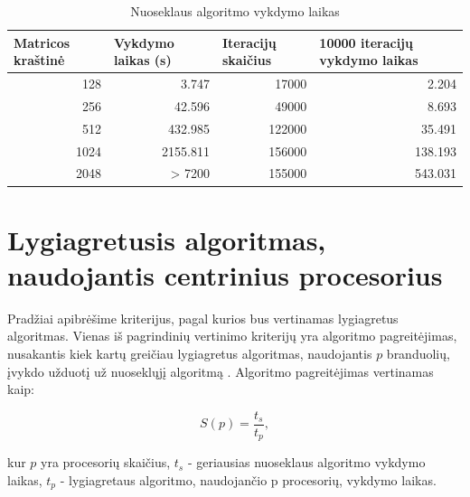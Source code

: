 \documentclass{VUMIFPSbakalaurinis}
\begin{document}
\begin{table}[]
    \begin{tabular}{|r|r|r|r|}
        \hline
        \multicolumn{1}{|l|}{Matricos kraštinė} & \multicolumn{1}{|l|}{Vykdymo laikas (s)} & \multicolumn{1}{|l|}{Iteracijų skaičius} & \multicolumn{1}{|l|}{10000 iteracijų vykdymo laikas} \\ \hline
        128                                     & 3.747                                    & 17000                                    & 2.204                                                \\ \hline
        256                                     & 42.596                                   & 49000                                    & 8.693                                                \\ \hline
        512                                     & 432.985                                  & 122000                                   & 35.491                                               \\ \hline
        1024                                    & 2155.811                                 & 156000                                   & 138.193                                              \\ \hline
        2048                                    & > 7200                                   & 155000                                   & 543.031                                              \\ \hline
    \end{tabular}
    \caption{Nuoseklaus algoritmo vykdymo laikas}
    \label{table:seq_time}
\end{table}


\section{Lygiagretusis algoritmas, naudojantis centrinius procesorius}

Pradžiai apibrėšime kriterijus, pagal kurios bus vertinamas lygiagretus algoritmas.
Vienas iš pagrindinių vertinimo kriterijų yra algoritmo pagreitėjimas, nusakantis kiek kartų greičiau lygiagretus algoritmas, naudojantis $p$ branduolių, įvykdo užduotį už nuoseklųjį algoritmą \cite{eager1989speedup}.   
Algoritmo pagreitėjimas vertinamas kaip:

\[ S(p) = \frac{t_s}{t_p} ,\]

kur $p$ yra procesorių skaičius, $t_s$ -  geriausias nuoseklaus algoritmo vykdymo laikas, $t_p$ - lygiagretaus algoritmo, naudojančio p procesorių, vykdymo laikas. 
\end{document}
